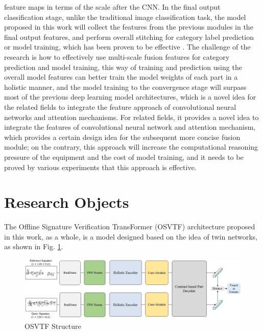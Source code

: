 feature maps in terms of the scale after the CNN. In the final output classification stage, unlike the traditional image classification task, the model proposed in this work will collect the features from the previous modules in the final output features, and perform overall stitching for category label prediction or model training, which has been proven to be effective \cite{41}. The challenge of the research is how to effectively use multi-scale fusion features for category prediction and model training, this way of training and prediction using the overall model features can better train the model weights of each part in a holistic manner, and the model training to the convergence stage will surpass most of the previous deep learning model architectures, which is a novel idea for the related fields to integrate the feature approach of convolutional neural networks and attention mechanisms. For related fields, it provides a novel idea to integrate the features of convolutional neural network and attention mechanism, which provides a certain design idea for the subsequent more concise fusion module; on the contrary, this approach will increase the computational reasoning pressure of the equipment and the cost of model training, and it needs to be proved by various experiments that this approach is effective.

\section{Research Objects}

The Offline Signature Verification TransFormer (OSVTF) architecture proposed in this work, as a whole, is a model designed based on the idea of twin networks, as shown in Fig. \ref{fig:overview}.

\begin{figure}[htbp]
    \begin{center}
        \includegraphics[scale=0.46]{figure/overview.jpg}
    \end{center}
    \caption{OSVTF Structure}
    \label{fig:overview}
\end{figure}

